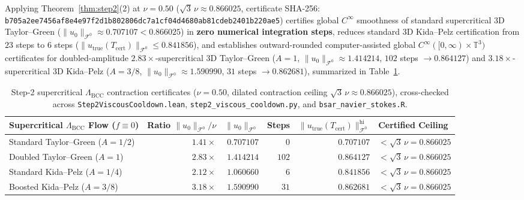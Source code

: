 \documentclass[11pt]{article}
\theoremstyle{plain}
\theoremstyle{definition}
\begin{document}
Applying Theorem~\ref{thm:step2}(2) at $\nu = 0.50$ ($\sqrt{3}\,\nu \approx 0.866025$, certificate SHA-256: \texttt{b705a2ee7456af8e\allowbreak 4e97f2d1b802806d\allowbreak c7a1cf04d4680ab8\allowbreak 1cdeb2401b220ae5}) certifies global $C^\infty$ smoothness of standard supercritical 3D Taylor--Green ($\|u_0\|_{\mathcal{F}^0} \approx 0.707107 < 0.866025$) in \textbf{zero numerical integration steps}, reduces standard 3D Kida--Pelz certification from $23$ steps to $6$ steps ($\|u_{\mathrm{true}}(T_{\mathrm{cert}})\|_{\mathcal{F}^0} \le 0.841856$), and establishes outward-rounded computer-assisted global $C^\infty([0,\infty)\times\mathbb{T}^3)$ certificates for doubled-amplitude $2.83\times$-supercritical 3D Taylor--Green ($A = 1$, $\|u_0\|_{\mathcal{F}^0} \approx 1.414214$, $102$ steps $\to 0.864127$) and $3.18\times$-supercritical 3D Kida--Pelz ($A = 3/8$, $\|u_0\|_{\mathcal{F}^0} \approx 1.590990$, $31$ steps $\to 0.862681$), summarized in Table~\ref{tab:step2}.

\begin{table}[htbp]
\centering
\caption{Step-2 supercritical $\Lambda_{\mathrm{BCC}}$ contraction certificates ($\nu = 0.50$, dilated contraction ceiling $\sqrt{3}\,\nu \approx 0.866025$), cross-checked across \texttt{Step2ViscousCooldown.lean}, \texttt{step2\_viscous\_cooldown.py}, and \texttt{bsar\_navier\_stokes.R}.}\label{tab:step2}
\vspace{4pt}
{\small\setlength{\tabcolsep}{4.5pt}
\begin{tabular}{@{}lrrrrl@{}}
\toprule
Supercritical $\Lambda_{\mathrm{BCC}}$ Flow ($f \equiv 0$) & Ratio $\|u_0\|_{\mathcal{F}^0}/\nu$ & $\|u_0\|_{\mathcal{F}^0}$ & Steps & $\|u_{\mathrm{true}}(T_{\mathrm{cert}})\|_{\mathcal{F}^0}^{\mathrm{hi}}$ & Certified Ceiling \\
\midrule
Standard Taylor--Green ($A=1/2$) & $1.41\times$ & $0.707107$ & $0$   & $0.707107$ & $< \sqrt{3}\,\nu = 0.866025$ \\
Doubled Taylor--Green ($A=1$)    & $2.83\times$ & $1.414214$ & $102$ & $0.864127$ & $< \sqrt{3}\,\nu = 0.866025$ \\
Standard Kida--Pelz ($A=1/4$)    & $2.12\times$ & $1.060660$ & $6$   & $0.841856$ & $< \sqrt{3}\,\nu = 0.866025$ \\
Boosted Kida--Pelz ($A=3/8$)     & $3.18\times$ & $1.590990$ & $31$  & $0.862681$ & $< \sqrt{3}\,\nu = 0.866025$ \\
\bottomrule
\end{tabular}}
\end{table}
\end{document}
